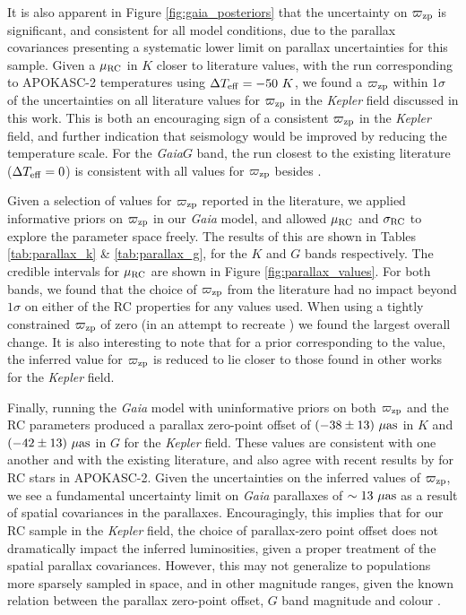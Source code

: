 \documentclass[fleqn,usenatbib]{mnras}
\newcommand{\oozp}{\mbox{$\varpi_{\rm zp}$}\xspace}
\newcommand{\muas}{\mbox{$\mu \rm as$}\xspace}
\newcommand{\murc}{\mbox{$\mu_{\rm RC}$}\xspace}
\newcommand{\sigrc}{\mbox{$\sigma_{\rm RC}$}\xspace}
\newcommand{\teff}{\mbox{$T_{\rm eff}$}\xspace}
\newcommand{\kepler}{\emph{Kepler}\xspace}
\newcommand{\gaia}{\emph{Gaia}\xspace}
\newcommand{\new}[1]{#1}
\newcommand{\nnew}[1]{#1}
\begin{document}
It is also apparent in Figure \ref{fig:gaia_posteriors} that the uncertainty on \oozp is significant, and consistent for all model conditions, due to the parallax covariances presenting a systematic lower limit on parallax uncertainties for this sample. Given a \murc in $K$ closer to literature values, with the run corresponding to APOKASC-2 temperatures using $\Delta\teff = -50\ K$, we found a \oozp within $1\sigma$ of the uncertainties on all literature values for \oozp in the \kepler field discussed in this work. This is both an encouraging sign of a consistent \oozp in the \kepler field, and further indication that seismology would be improved by reducing the temperature scale. For the \gaia $G$ band, the run closest to the existing literature ($\Delta\teff = 0$) is consistent with all values for \oozp besides \cite{art:stassun+torres2018}.

Given a selection of values for \oozp reported in the literature, we applied informative priors on \oozp in our \gaia model, and allowed \murc and \sigrc to explore the parameter space freely. The results of this are shown in Tables \ref{tab:parallax_k} \& \ref{tab:parallax_g}, for the $K$ and $G$ bands respectively. The credible intervals for \murc are shown in Figure \ref{fig:parallax_values}. For both bands, we found that the choice of \oozp from the literature had no impact beyond $1\sigma$ on either of the RC properties for any values used. When using a tightly constrained \oozp of zero (in an attempt to recreate ) we found the largest overall change. It is also interesting to note that for a prior corresponding to the \cite{art:stassun+torres2018} value, the inferred value for \oozp is reduced to lie closer to those found in other works for the \kepler field.

\new{Finally, running the \gaia model with uninformative priors on both \oozp and the RC parameters produced a parallax zero-point offset of $(-38\pm13)\ \muas$ in $K$ and $(-42\pm13)\ \muas$ in $G$ for the \kepler field. These values are consistent with one another and with the existing literature, and also agree with recent results by \cite{art:khan+2019} for RC stars in APOKASC-2.} Given the uncertainties on the inferred values of \oozp, we see a fundamental uncertainty limit on \gaia parallaxes of $\sim 13\ \mu \rm as$ as a result of spatial covariances in the parallaxes. \new{Encouragingly, this implies that for our RC sample in the \kepler field, the choice of parallax-zero point offset \nnew{does not dramatically impact} the inferred luminosities, given a proper treatment of the spatial parallax covariances. However, this may not generalize to populations more sparsely sampled in space, and in other magnitude ranges, given the known relation between the parallax zero-point offset, $G$ band magnitude and colour \citep{art:zinn+2018,art:lindegren+2018}.}
\end{document}
